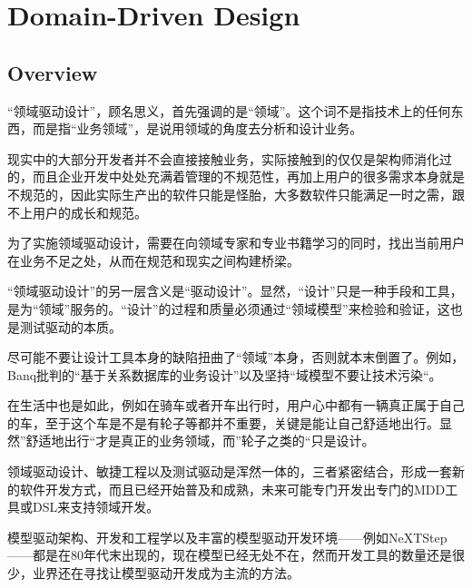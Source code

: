 \part{Domain-Driven Design}

\chapter{Overview}




“领域驱动设计”，顾名思义，首先强调的是“领域”。这个词不是指技术上的任何东西，而是指“业务领域”，是说用领域的角度去分析和设计业务。
 
现实中的大部分开发者并不会直接接触业务，实际接触到的仅仅是架构师消化过的，而且企业开发中处处充满着管理的不规范性，再加上用户的很多需求本身就是不规范的，因此实际生产出的软件只能是怪胎，大多数软件只能满足一时之需，跟不上用户的成长和规范。

为了实施领域驱动设计，需要在向领域专家和专业书籍学习的同时，找出当前用户在业务不足之处，从而在规范和现实之间构建桥梁。

“领域驱动设计”的另一层含义是“驱动设计”。显然，“设计”只是一种手段和工具，是为“领域”服务的。“设计”的过程和质量必须通过“领域模型”来检验和验证，这也是测试驱动的本质。



尽可能不要让设计工具本身的缺陷扭曲了“领域”本身，否则就本末倒置了。例如，Banq批判的“基于关系数据库的业务设计”以及坚持“域模型不要让技术污染“。

在生活中也是如此，例如在骑车或者开车出行时，用户心中都有一辆真正属于自己的车，至于这个车是不是有轮子等都并不重要，关键是能让自己舒适地出行。显然”舒适地出行“才是真正的业务领域，而”轮子之类的“只是设计。

领域驱动设计、敏捷工程以及测试驱动是浑然一体的，三者紧密结合，形成一套新的软件开发方式，而且已经开始普及和成熟，未来可能专门开发出专门的MDD工具或DSL来支持领域开发。

模型驱动架构、开发和工程学以及丰富的模型驱动开发环境——例如NeXTStep——都是在80年代末出现的，现在模型已经无处不在，然而开发工具的数量还是很少，业界还在寻找让模型驱动开发成为主流的方法。

